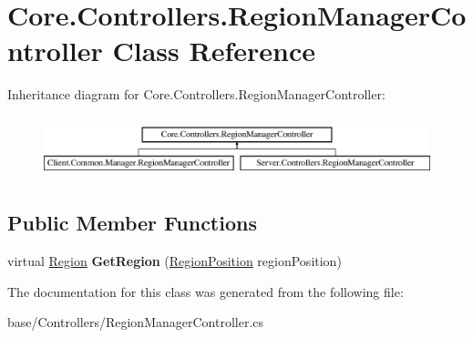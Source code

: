 \hypertarget{classCore_1_1Controllers_1_1RegionManagerController}{\section{Core.\-Controllers.\-Region\-Manager\-Controller Class Reference}
\label{classCore_1_1Controllers_1_1RegionManagerController}
}
Inheritance diagram for Core.\-Controllers.\-Region\-Manager\-Controller\-:\begin{figure}[H]
\begin{center}
\leavevmode
\includegraphics[height=1.812298cm]{classCore_1_1Controllers_1_1RegionManagerController}
\end{center}
\end{figure}
\subsection*{Public Member Functions}
\begin{DoxyCompactItemize}
\item 
\hypertarget{classCore_1_1Controllers_1_1RegionManagerController_a1ce55cf6fb0ba5f0b5711e70ffb86467}{virtual \hyperlink{classCore_1_1Models_1_1Region}{Region} {\bfseries Get\-Region} (\hyperlink{classCore_1_1Models_1_1RegionPosition}{Region\-Position} region\-Position)}\label{classCore_1_1Controllers_1_1RegionManagerController_a1ce55cf6fb0ba5f0b5711e70ffb86467}

\end{DoxyCompactItemize}


The documentation for this class was generated from the following file\-:\begin{DoxyCompactItemize}
\item 
base/\-Controllers/Region\-Manager\-Controller.\-cs\end{DoxyCompactItemize}
